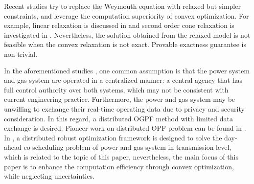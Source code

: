\documentclass[journal]{IEEEtran}
\begin{document}
Recent studies try to replace the Weymouth equation with relaxed but simpler constraints, and leverage the computation superiority of convex optimization. For example, linear relaxation is discussed in \cite{Hantao_LP} and second order cone relaxation is investigated in \cite{Conrado_MISOCP}. Nevertheless, the solution obtained from the relaxed model is not feasible when the convex relaxation is not exact. Provable exactness guarantee is non-trivial.

In the aforementioned studies \cite{Chaudry_DCOPF,Cong_Dispatch,Cong_PDE,Anatoly_PDE,Chengcheng_MILP,Alberto_Newton,Sheng_Probabilistic,Carlos_MILP}, one common assumption is that the power system and gas system are operated in a centralized manner: a central agency that has full control authority over both systems, which may not be consistent with current engineering practice. Furthermore, the power and gas system may be unwilling to exchange their real-time operating data due to privacy and security consideration.  In this regard, a distributed OGPF method with limited data exchange is desired. Pioneer work on distributed OPF problem can be found in \cite{DOPF1,DOPF2,DOPF3}. In \cite{He_ADMM}, a distributed robust optimization framework is designed to solve the day-ahead co-scheduling problem of power and gas system in transmission level, which is related to the topic of this paper, nevertheless, the main focus of this paper is to enhance the computation efficiency through convex optimization, while neglecting uncertainties.
\end{document}
